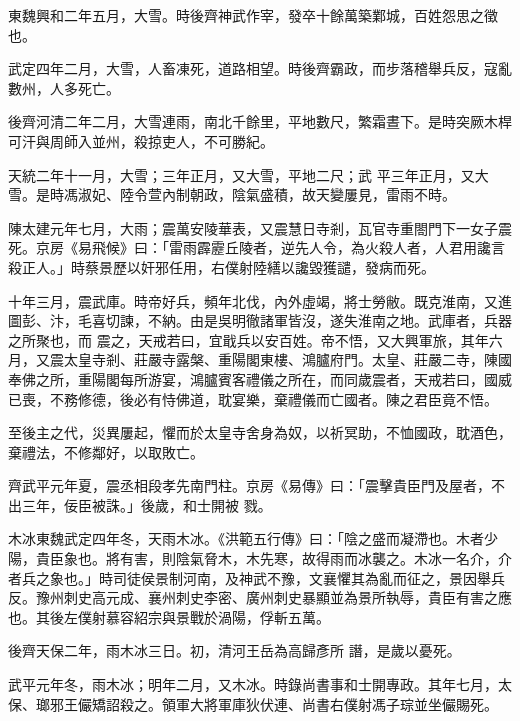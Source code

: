 \begin{pinyinscope}
 東魏興和二年五月，大雪。時後齊神武作宰，發卒十餘萬築鄴城，百姓怨思之徵也。



 武定四年二月，大雪，人畜凍死，道路相望。時後齊霸政，而步落稽舉兵反，寇亂數州，人多死亡。



 後齊河清二年二月，大雪連雨，南北千餘里，平地數尺，繁霜晝下。是時突厥木桿可汗與周師入並州，殺掠吏人，不可勝紀。



 天統二年十一月，大雪；三年正月，又大雪，平地二尺；武
 平三年正月，又大雪。是時馮淑妃、陸令萱內制朝政，陰氣盛積，故天變屢見，雷雨不時。



 陳太建元年七月，大雨；震萬安陵華表，又震慧日寺剎，瓦官寺重閤門下一女子震死。京房《易飛候》曰：「雷雨霹靂丘陵者，逆先人令，為火殺人者，人君用讒言殺正人。」時蔡景歷以奸邪任用，右僕射陸繕以讒毀獲譴，發病而死。



 十年三月，震武庫。時帝好兵，頻年北伐，內外虛竭，將士勞敝。既克淮南，又進圖彭、汴，毛喜切諫，不納。由是吳明徹諸軍皆沒，遂失淮南之地。武庫者，兵器之所聚也，而
 震之，天戒若曰，宜戢兵以安百姓。帝不悟，又大興軍旅，其年六月，又震太皇寺剎、莊嚴寺露槃、重陽閣東樓、鴻臚府門。太皇、莊嚴二寺，陳國奉佛之所，重陽閣每所游宴，鴻臚賓客禮儀之所在，而同歲震者，天戒若曰，國威已喪，不務修德，後必有恃佛道，耽宴樂，棄禮儀而亡國者。陳之君臣竟不悟。



 至後主之代，災異屢起，懼而於太皇寺舍身為奴，以祈冥助，不恤國政，耽酒色，棄禮法，不修鄰好，以取敗亡。



 齊武平元年夏，震丞相段孝先南門柱。京房《易傳》曰：「震擊貴臣門及屋者，不出三年，佞臣被誅。」後歲，和士開被
 戮。



 木冰東魏武定四年冬，天雨木冰。《洪範五行傳》曰：「陰之盛而凝滯也。木者少陽，貴臣象也。將有害，則陰氣脅木，木先寒，故得雨而冰襲之。木冰一名介，介者兵之象也。」時司徒侯景制河南，及神武不豫，文襄懼其為亂而征之，景因舉兵反。豫州刺史高元成、襄州刺史李密、廣州刺史暴顯並為景所執辱，貴臣有害之應也。其後左僕射慕容紹宗與景戰於渦陽，俘斬五萬。



 後齊天保二年，雨木冰三日。初，清河王岳為高歸彥所
 譖，是歲以憂死。



 武平元年冬，雨木冰；明年二月，又木冰。時錄尚書事和士開專政。其年七月，太保、瑯邪王儼矯詔殺之。領軍大將軍庫狄伏連、尚書右僕射馮子琮並坐儼賜死。




\end{pinyinscope}
